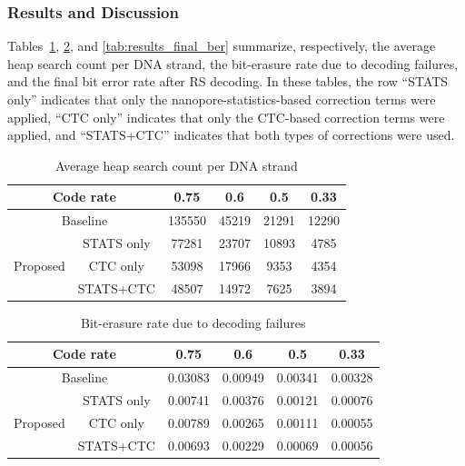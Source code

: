 \documentclass[sotsuron]{kuee}
\begin{document}
\subsubsection{Results and Discussion}
Tables~\ref{tab:results_heap}, \ref{tab:results_deletion}, and \ref{tab:results_final_ber} summarize,
respectively, the average heap search count per DNA strand, the bit-erasure rate due to decoding failures,
and the final bit error rate after RS decoding.
In these tables,
the row ``STATS only'' indicates that only the nanopore-statistics-based correction terms were applied,
``CTC only'' indicates that only the CTC-based correction terms were applied, and ``STATS+CTC'' indicates
that both types of corrections were used.
\begin{table}
  \centering
  \caption{Average heap search count per DNA strand}
  \label{tab:results_heap}
  \begin{tabular}{c|c|cccc}
    \hline
    \multicolumn{2}{c|}{Code rate} & 0.75 & 0.6 & 0.5 & 0.33 \\
    \hline
    \multicolumn{2}{c|}{Baseline} & 135550 & 45219 & 21291 & 12290 \\
    \hline
    \multirow{3}{*}{Proposed} & STATS only & 77281 & 23707 & 10893 & 4785 \\
    \cline{2-6}
     & CTC only & 53098 & 17966 & 9353 & 4354 \\
    \cline{2-6}
     & STATS+CTC & 48507 & 14972 & 7625 & 3894 \\
    \hline
  \end{tabular}
\end{table}
\begin{table}
  \centering
  \caption{Bit-erasure rate due to decoding failures}
  \label{tab:results_deletion}
  \begin{tabular}{c|c|cccc}
    \hline
    \multicolumn{2}{c|}{Code rate} & 0.75 & 0.6 & 0.5 & 0.33 \\
    \hline
    \multicolumn{2}{c|}{Baseline} & 0.03083 & 0.00949 & 0.00341 & 0.00328 \\
    \hline
    \multirow{3}{*}{Proposed} & STATS only & 0.00741 & 0.00376 & 0.00121 & 0.00076 \\
    \cline{2-6}
     & CTC only & 0.00789 & 0.00265 & 0.00111 & 0.00055 \\
    \cline{2-6}
     & STATS+CTC & 0.00693 & 0.00229 & 0.00069 & 0.00056 \\
    \hline
  \end{tabular}
\end{table}
\end{document}
